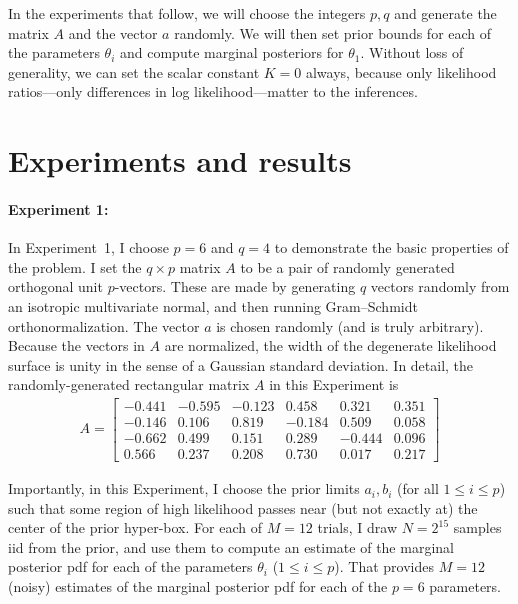 \documentclass[10pt]{article}
\begin{document}
In the experiments that follow, we will choose the integers $p, q$ and generate the matrix $A$ and the vector $a$ randomly.
We will then set prior bounds for each of the parameters $\theta_i$ and compute marginal posteriors for $\theta_1$.
Without loss of generality, we can set the scalar constant $K=0$ always, because only likelihood ratios---only differences in log likelihood---matter to the inferences.

\section{Experiments and results}
\paragraph{Experiment 1:}
In Experiment~1, I choose $p=6$ and $q=4$ to demonstrate the basic properties of the problem.
I set the $q\times p$ matrix $A$ to be a pair of randomly generated orthogonal unit $p$-vectors.
These are made by generating $q$ vectors randomly from an isotropic multivariate normal, and then running Gram--Schmidt orthonormalization.
The vector $a$ is chosen randomly (and is truly arbitrary).
Because the vectors in $A$ are normalized, the width of the degenerate likelihood surface is unity in the sense of a Gaussian standard deviation.
In detail, the randomly-generated rectangular matrix $A$ in this Experiment is
\begin{align}
    A = \begin{bmatrix}
  -0.441 &-0.595 &-0.123 & 0.458 & 0.321 & 0.351 \\
  -0.146 & 0.106 & 0.819 &-0.184 & 0.509 & 0.058 \\
  -0.662 & 0.499 & 0.151 & 0.289 &-0.444 & 0.096 \\
   0.566 & 0.237 & 0.208 & 0.730 & 0.017 & 0.217\end{bmatrix}
\end{align}

Importantly, in this Experiment, I choose the prior limits $a_i, b_i$ (for all $1\leq i\leq p$) such that some region of high likelihood passes near (but not exactly at) the center of the prior hyper-box.
For each of $M=12$ trials, I draw $N=2^{15}$ samples iid from the prior, and use them to compute an estimate of the marginal posterior pdf for each of the parameters $\theta_i$ ($1\leq i\leq p$).
That provides $M=12$ (noisy) estimates of the marginal posterior pdf for each of the $p=6$ parameters.
\end{document}
